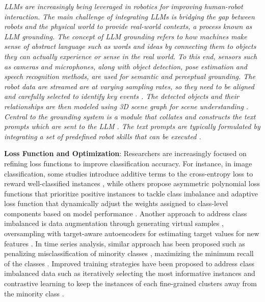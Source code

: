 \documentclass[preprint,12pt]{elsarticle}
\begin{document}
\emph{LLMs are increasingly being leveraged in robotics for improving human-robot interaction. The main challenge of integrating LLMs is bridging the gap between robots and the physical world to provide real-world contexts, a process known as LLM grounding. The concept of LLM grounding refers to how machines make sense of abstract language such as words and ideas by connecting them to objects they can actually experience or sense in the real world. To this end, sensors such as cameras and microphones, along with object detection, pose estimation and speech recognition methods, are used for semantic and perceptual grounding. The robot data are streamed are at varying sampling rates, so they need to be aligned and carefully selected to identify key events \citep{wang_i_2024}. The detected objects and their relationships are then modeled using 3D scene graph for scene understanding \citep{chen_synergai_2024}. Central to the grounding system is a module that collates and constructs the text prompts which are sent to the LLM \citep{allgeuer_when_2024}. The text prompts are typically formulated by integrating a set of predefined robot skills that can be executed \citep{asuzu_humanrobot_2025}.}

\textbf{Loss Function and Optimization}: Researchers are increasingly focused on refining loss functions to improve classification accuracy. For instance, in image classification, some studies introduce additive terms to the cross-entropy loss to reward well-classified instances \citep{zhao_well-classified_2022}, while others propose asymmetric polynomial loss functions that prioritize positive instances to tackle class imbalance \citep{huang_asymmetric_2023} and adaptive loss function that dynamically adjust the weights assigned to class-level components based on model performance \citep{maldonado2023owadapt}. Another approach to address class imbalanced is data augmentation through generating virtual samples \citep{zhu2024irda}, oversampling with target-aware autoencoders for estimating target values for new features \citep{belhaouari2024oversampling}. In time series analysis, similar approach has been proposed such as penalizing misclassification of minority classes \citep{wang2024class}, maximizing the minimum recall of the classes \citep{ircio2023minimum}. Improved training strategies have been proposed to address class imbalanced data such as iteratively selecting the most informative instances \citep{moles2024exploring} and contrastive learning to keep the instances of each fine-grained clusters away from the minority class \citep{zhu2024sfpl}.
\end{document}
